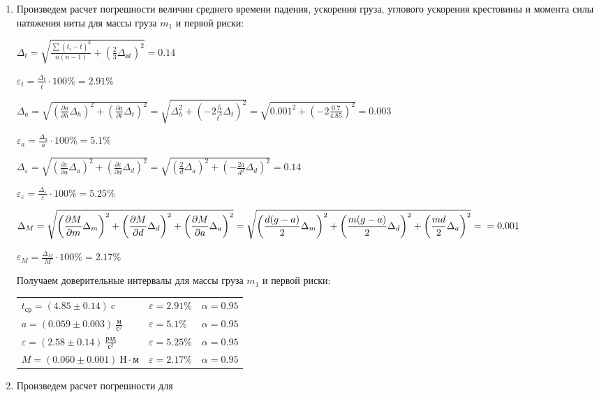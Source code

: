 \begin{enumerate}
    \item Произведем расчет погрешности величин среднего времени падения, ускорения груза, углового ускорения крестовины и момента силы натяжения ниты для массы груза $m_1$ и первой риски:

    $\displaystyle \Delta_t = \sqrt{\frac{\sum (t_i - \overline{t})^2}{n(n - 1)} + (\frac{2}{3}\Delta_{\text{и}t})^2} = 0.14$

    $\displaystyle \varepsilon_t = \frac{\Delta_t}{\overline{t}} \cdot 100\% = 2.91\%$

    $\displaystyle \Delta_a = \sqrt{\left(\frac{\partial a}{\partial h}\Delta_h\right)^2 + \left(\frac{\partial a}{\partial t} \Delta_t\right)^2} = 
    \sqrt{\Delta_h^2 + \left(-2\frac{\overline{h}}{\overline{t}^3} \Delta_t\right)^2} = \sqrt{0.001^2 + \left(-2\frac{0.7}{4.85}\right)^2} = 0.003$

    $\displaystyle \varepsilon_a = \frac{\Delta_a}{a} \cdot 100\% = 5.1\%$

    $\displaystyle \Delta_\varepsilon = \sqrt{\left(\frac{\partial \varepsilon}{\partial a}\Delta_a\right)^2 + \left(\frac{\partial \varepsilon}{\partial d}\Delta_d\right)^2} = 
    \sqrt{\left(\frac{2}{d}\Delta_a\right)^2 + \left(-\frac{2a}{d^2}\Delta_d\right)^2} = 0.14$

    $\displaystyle \varepsilon_\varepsilon = \frac{\Delta_\varepsilon}{\varepsilon} \cdot 100\% = 5.25\%$

    $\displaystyle \Delta_M = \sqrt{\left(\frac{\partial M}{\partial m}\Delta_m\right)^2 + \left(\frac{\partial M}{\partial d}\Delta_d\right)^2 + \left(\frac{\partial M}{\partial a}\Delta_a\right)^2} = 
    \sqrt{\left(\frac{d(g - a)}{2}\Delta_m\right)^2 + \left(\frac{m(g - a)}{2}\Delta_d\right)^2 + \left(\frac{md}{2}\Delta_a\right)^2} = \\ = 0.001$

    $\displaystyle \varepsilon_M = \frac{\Delta_M}{M} \cdot 100\% = 2.17\%$

    Получаем доверительные интервалы для массы груза $m_1$ и первой риски:

    \begin{tabular}{lll}
        $t_\text{ср} = (4.85 \pm 0.14) \ \text{c}$ & $\varepsilon = 2.91\%$ & $\alpha = 0.95$ \\

        $a = (0.059 \pm 0.003) \ \frac{\text{м}}{\text{с}^2}$ & $\varepsilon = 5.1\%$ & $\alpha = 0.95$ \\

        $\varepsilon = (2.58 \pm 0.14) \ \frac{\text{рад}}{\text{с}^2}$ & $\varepsilon = 5.25\%$ & $\alpha = 0.95$ \\

        $M = (0.060 \pm 0.001) \ \text{Н} \cdot \text{м}$ & $\varepsilon = 2.17\%$ & $\alpha = 0.95$ \\
    \end{tabular}

    \item Произведем расчет погрешности для $ $

\end{enumerate}
